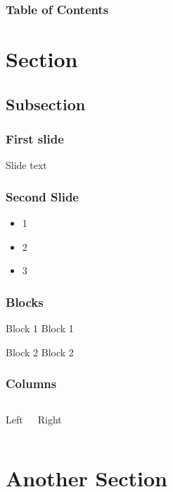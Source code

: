 \documentclass{beamer}
\begin{document}
\begin{frame}
\titlepage
\end{frame}

\begin{frame}
\frametitle{Table of Contents}
\tableofcontents
\end{frame}


\section{Section}

\subsection{Subsection}

\begin{frame}
\frametitle{First slide}
Slide text
\end{frame}


\begin{frame}
\frametitle{Second Slide}
\begin{itemize}
\item 1
\item 2
\item 3
\end{itemize}
\end{frame}

\begin{frame}
\frametitle{Blocks}
\begin{block}{Block 1}
Block 1
\end{block}

\begin{block}{Block 2}
Block 2
\end{block}
\end{frame}

\begin{frame}
\frametitle{Columns}
\begin{columns}[c]

Left

Right

\end{columns}
\end{frame}


\section{Another Section}
\end{document}
